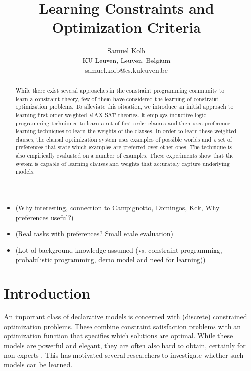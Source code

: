 \documentclass[letterpaper]{article}
\theoremstyle{definition}
\newcommand{\sam}[1]{{\color{red}(#1)}}
\begin{document}
\title{Learning Constraints and Optimization Criteria}
\author{
  Samuel Kolb\\
  KU Leuven, Leuven, Belgium\\
  samuel.kolb@cs.kuleuven.be
}

\maketitle

\begin{abstract}
While there exist several approaches in the constraint programming community to learn a constraint theory, few of them have considered the learning of constraint optimization problems.
To alleviate this situation, we introduce an initial approach to learning first-order weighted MAX-SAT theories. 
It employs inductive logic programming techniques to learn a set of first-order clauses and then uses preference learning techniques to learn the weights of the clauses.
In order to learn these weighted clauses, the clausal optimization system uses examples of possible worlds and a set of preferences that state which examples are preferred over other ones.
The technique is also empirically evaluated on a number of examples.
These experiments show that the system is capable of learning clauses and weights that accurately capture underlying models.
\end{abstract}


\begin{itemize}
  \item \sam{Why interesting, connection to Campignotto, Domingos, Kok, Why preferences useful?}
  \item \sam{Real tasks with preferences? Small scale evaluation}
  \item \sam{Lot of background knowledge assumed (vs. constraint programming, probabilistic programming, demo model and need for learning)}
\end{itemize}

\section{Introduction}
An important class of declarative models is concerned with (discrete) constrained optimization problems.
These combine constraint satisfaction problems with an optimization function that specifies which solutions are optimal.
While these models are powerful and elegant, they are often also hard to obtain, certainly for non-experts \cite{Wallace:PrinciplesCP}.
This has motivated several researchers to investigate whether such models can be learned. 
\end{document}
